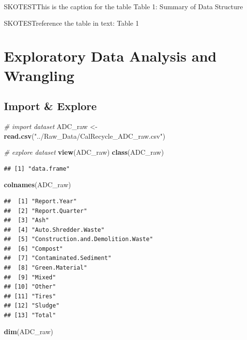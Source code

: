 \documentclass[12pt,]{article}
\newenvironment{Shaded}{\begin{snugshade}}{\end{snugshade}}
\newcommand{\KeywordTok}[1]{\textcolor[rgb]{0.13,0.29,0.53}{\textbf{#1}}}
\newcommand{\StringTok}[1]{\textcolor[rgb]{0.31,0.60,0.02}{#1}}
\newcommand{\CommentTok}[1]{\textcolor[rgb]{0.56,0.35,0.01}{\textit{#1}}}
\newcommand{\NormalTok}[1]{#1}
\begin{document}
SKOTESTThis is the caption for the table Table 1: Summary of Data
Structure

SKOTESTreference the table in text: Table 1

\newpage

\section{Exploratory Data Analysis and
Wrangling}\label{exploratory-data-analysis-and-wrangling}

\subsection{Import \& Explore}\label{import-explore}

\begin{Shaded}
\begin{Highlighting}[]
\CommentTok{# import dataset}
\NormalTok{ADC_raw <-}\StringTok{ }\KeywordTok{read.csv}\NormalTok{(}\StringTok{"../Raw_Data/CalRecycle_ADC_raw.csv"}\NormalTok{)}

\CommentTok{# explore dataset}
\KeywordTok{view}\NormalTok{(ADC_raw)}
\KeywordTok{class}\NormalTok{(ADC_raw)}
\end{Highlighting}
\end{Shaded}

\begin{verbatim}
## [1] "data.frame"
\end{verbatim}

\begin{Shaded}
\begin{Highlighting}[]
\KeywordTok{colnames}\NormalTok{(ADC_raw)}
\end{Highlighting}
\end{Shaded}

\begin{verbatim}
##  [1] "Report.Year"                      
##  [2] "Report.Quarter"                   
##  [3] "Ash"                              
##  [4] "Auto.Shredder.Waste"              
##  [5] "Construction.and.Demolition.Waste"
##  [6] "Compost"                          
##  [7] "Contaminated.Sediment"            
##  [8] "Green.Material"                   
##  [9] "Mixed"                            
## [10] "Other"                            
## [11] "Tires"                            
## [12] "Sludge"                           
## [13] "Total"
\end{verbatim}

\begin{Shaded}
\begin{Highlighting}[]
\KeywordTok{dim}\NormalTok{(ADC_raw)}
\end{Highlighting}
\end{Shaded}
\end{document}
